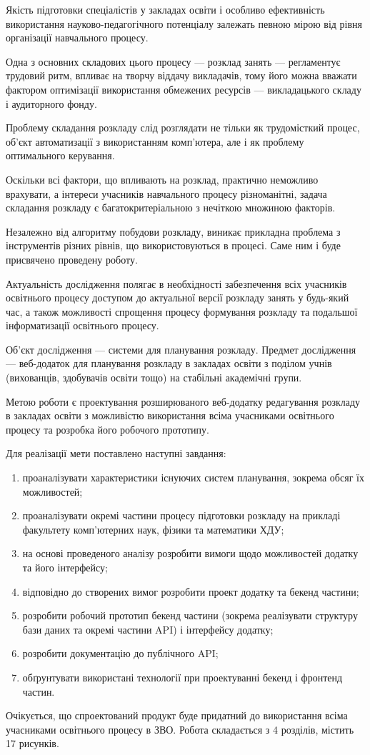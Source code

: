 
Якість підготовки спеціалістів у закладах освіти і особливо ефективність використання науково-педагогічного потенціалу залежать певною мірою від рівня організації навчального процесу.

Одна з основних складових цього процесу — розклад занять — регламентує трудовий ритм, впливає на творчу віддачу викладачів, тому його можна вважати фактором оптимізації використання обмежених ресурсів — викладацького складу і аудиторного фонду.

Проблему складання розкладу слід розглядати не тільки як трудомісткий процес, об'єкт автоматизації з використанням комп’ютера, але і як проблему оптимального керування. 

Оскільки всі фактори, що впливають на розклад, практично неможливо врахувати, а інтереси учасників навчального процесу різноманітні, задача складання розкладу є багатокритеріальною з нечіткою множиною факторів.

Незалежно від алгоритму побудови розкладу, виникає прикладна проблема з інструментів різних рівнів, що використовуються в процесі. Саме ним і буде присвячено проведену роботу.

Актуальність дослідження полягає в необхідності забезпечення всіх учасників освітнього процесу доступом до актуальної версії розкладу занять у будь-який час, а також можливості спрощення процесу формування розкладу та подальшої інформатизації освітнього процесу.

Об’єкт дослідження — системи для планування розкладу. Предмет дослідження —  веб-додаток для планування розкладу в закладах освіти з поділом учнів (вихованців, здобувачів освіти тощо) на стабільні академічні групи.

Метою роботи є проектування розширюваного веб-додатку редагування розкладу в закладах освіти з можливістю використання всіма учасниками освітнього процесу та розробка його робочого прототипу.

Для реалізації мети поставлено наступні завдання:
\begin{enumerate}
	\item проаналізувати характеристики існуючих систем планування, зокрема обсяг їх можливостей;
	
	\item проаналізувати окремі частини процесу підготовки розкладу на прикладі факультету комп’ютерних наук, фізики та математики ХДУ;
	\item на основі проведеного аналізу розробити вимоги щодо можливостей додатку та його інтерфейсу;
	\item відповідно до створених вимог розробити проект додатку та бекенд частини;
	\item розробити робочий прототип бекенд частини (зокрема реалізувати структуру бази даних та окремі частини API) і інтерфейсу додатку;
	\item розробити документацію до публічного API;
	\item обґрунтувати використані технології при проектуванні бекенд і фронтенд частин.
\end{enumerate}

Очікується, що спроектований продукт буде придатний до використання всіма учасниками освітнього процесу в ЗВО.
Робота складається з 4 розділів, містить 17 рисунків. 
